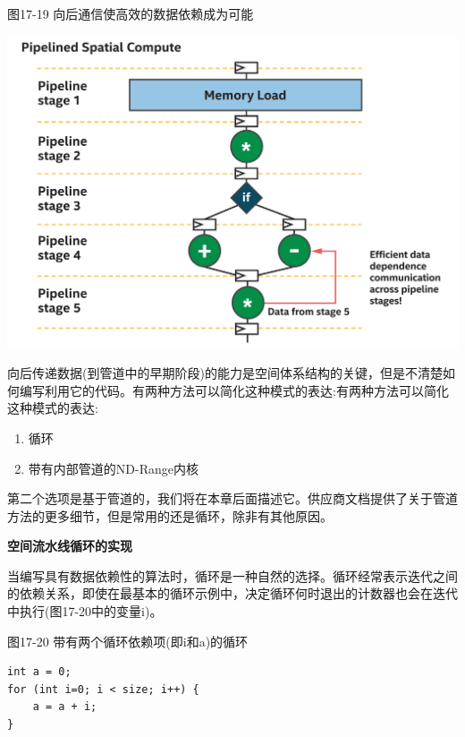 \hspace*{\fill} \par %
图17-19 向后通信使高效的数据依赖成为可能
\begin{center}
	\includegraphics[width=1.0\textwidth]{content/chapter-17/images/16}
\end{center}

向后传递数据(到管道中的早期阶段)的能力是空间体系结构的关键，但是不清楚如何编写利用它的代码。有两种方法可以简化这种模式的表达:有两种方法可以简化这种模式的表达:\par

\begin{enumerate}
	\item 循环
	\item 带有内部管道的ND-Range内核
\end{enumerate}

第二个选项是基于管道的，我们将在本章后面描述它。供应商文档提供了关于管道方法的更多细节，但是常用的还是循环，除非有其他原因。\par

\hspace*{\fill} \par %
\textbf{空间流水线循环的实现}

当编写具有数据依赖性的算法时，循环是一种自然的选择。循环经常表示迭代之间的依赖关系，即使在最基本的循环示例中，决定循环何时退出的计数器也会在迭代中执行(图17-20中的变量i)。\par

\hspace*{\fill} \par %
图17-20 带有两个循环依赖项(即i和a)的循环
\begin{lstlisting}[caption={}]
int a = 0;
for (int i=0; i < size; i++) {
	a = a + i;
}
\end{lstlisting}

